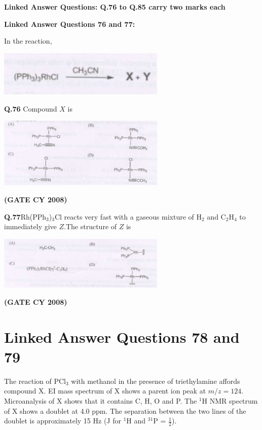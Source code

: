 \documentclass[12pt]{article}
\begin{document}
\begin{enumerate}
\textbf{Linked Answer Questions: Q.76 to Q.85 carry two marks each}

\textbf{Linked Answer Questions 76 and 77:}

In the reaction,

\begin{center}
\includegraphics[width=0.6\textwidth]{figs/q76 1.png}
\end{center}

\textbf{Q.76} Compound $X$ is

\begin{center}
\includegraphics[width=0.6\textwidth]{figs/q76_2.png}
\end{center}   \textbf{(GATE CY 2008)}


\textbf{Q.77}Rh(PPh$_3$)$_3$Cl reacts very fast with a gaseous mixture of H$_2$ and C$_2$H$_4$ to immediately give $Z$.The structure of $Z$ is

\begin{center}
\includegraphics[width=0.6\textwidth]{figs/q77.png}
\end{center}   \textbf{(GATE CY 2008)}


\section*{Linked Answer Questions 78 and 79}

The reaction of PCl$_3$ with methanol in the presence of triethylamine affords compound X. EI mass spectrum of X shows a parent ion peak at $m/z = 124$. Microanalysis of X shows that it contains C, H, O and P. The $^1$H NMR spectrum of X shows a doublet at 4.0 ppm. The separation between the two lines of the doublet is approximately 15 Hz (J for $^1$H and $^{31}$P = $\tfrac{1}{2}$).


\end{enumerate}
\end{document}
